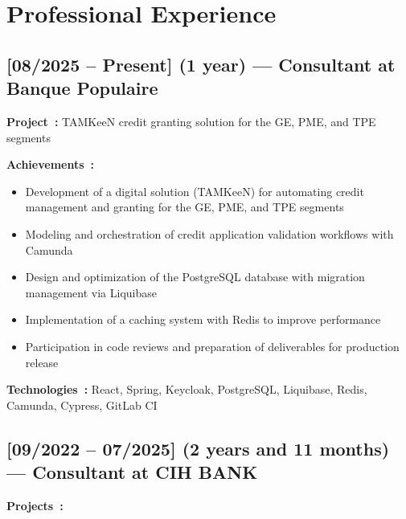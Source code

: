 \section*{Professional Experience}

\subsection*{[08/2025 -- Present] (1 year) --- Consultant at Banque Populaire}
\vspace{4pt}
\textbf{Project~:} TAMKeeN credit granting solution for the GE, PME, and TPE segments

\textbf{Achievements~:}
\begin{itemize}
    \item Development of a digital solution (TAMKeeN) for automating credit management and granting for the GE, PME, and TPE segments
    \item Modeling and orchestration of credit application validation workflows with Camunda
    \item Design and optimization of the PostgreSQL database with migration management via Liquibase
    \item Implementation of a caching system with Redis to improve performance
    \item Participation in code reviews and preparation of deliverables for production release
\end{itemize}
\textbf{Technologies~:} React, Spring, Keycloak, PostgreSQL, Liquibase, Redis, Camunda, Cypress, GitLab CI

\subsection*{[09/2022 -- 07/2025] (2 years and 11 months) --- Consultant at CIH BANK}
\textbf{Projects~:}

